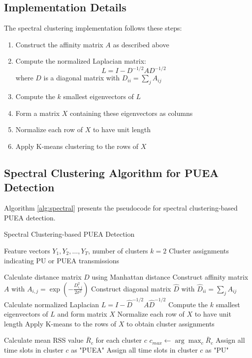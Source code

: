 \subsection{Implementation Details}

The spectral clustering implementation follows these steps:

\begin{enumerate}
    \item Construct the affinity matrix $A$ as described above
    \item Compute the normalized Laplacian matrix:
    \begin{equation}
        L = I - D^{-1/2} A D^{-1/2}
    \end{equation}
    where $D$ is a diagonal matrix with $D_{ii} = \sum_j A_{ij}$
    
    \item Compute the $k$ smallest eigenvectors of $L$
    \item Form a matrix $X$ containing these eigenvectors as columns
    \item Normalize each row of $X$ to have unit length
    \item Apply K-means clustering to the rows of $X$
\end{enumerate}

\subsection{Spectral Clustering Algorithm for PUEA Detection}

Algorithm \ref{alg:spectral} presents the pseudocode for spectral clustering-based PUEA detection.

\begin{algorithm}
\caption{Spectral Clustering-based PUEA Detection}
\label{alg:spectral}
\begin{algorithmic}[1]
\Require Feature vectors $Y_1, Y_2, \ldots, Y_T$, number of clusters $k=2$
\Ensure Cluster assignments indicating PU or PUEA transmissions

\State Calculate distance matrix $D$ using Manhattan distance
\State Construct affinity matrix $A$ with $A_{i,j} = \exp\left(-\frac{D_{i,j}^2}{2\sigma^2}\right)$
\State Construct diagonal matrix $\hat{D}$ with $\hat{D}_{ii} = \sum_j A_{ij}$
\State Calculate normalized Laplacian $L = I - \hat{D}^{-1/2} A \hat{D}^{-1/2}$
\State Compute the $k$ smallest eigenvectors of $L$ and form matrix $X$
\State Normalize each row of $X$ to have unit length
\State Apply K-means to the rows of $X$ to obtain cluster assignments

\State Calculate mean RSS value $\bar{R}_c$ for each cluster $c$
\State $c_{max} \gets \arg\max_c \bar{R}_c$ 
        \State Assign all time slots in cluster $c$ as "PUEA"
    \Else
        \State Assign all time slots in cluster $c$ as "PU"
    \EndIf
\EndFor

\end{algorithmic}
\end{algorithm}

